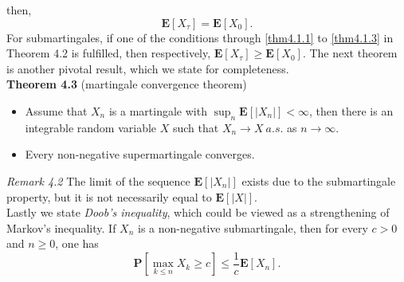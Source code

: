 \documentclass[
11pt, %
a4paper, %
oneside, %
headinclude,footinclude, %
BCOR5mm, %
]{scrartcl}
\begin{document}
then,
\begin{equation}
    \mathbf{E}[X_{\tau}]=\mathbf{E}[X_0]. \tag{4.10}
\end{equation}
For submartingales, if one of the conditions through \ref{thm4.1.1} to \ref{thm4.1.3} in Theorem 4.2 is fulfilled, then respectively, $\mathbf{E}[X_{\tau}] \geq \mathbf{E}[X_0]$. The next theorem is another pivotal result, which we state for completeness.
\vspace{0.6em}\\\textbf{Theorem 4.3} (martingale convergence theorem) 
\begin{itemize}
    \item Assume that $X_n$ is a martingale with $\sup_n \mathbf{E}[|X_n|] < \infty$, then there is an integrable random variable $X$ such that $X_n \rightarrow X \ a.s.$ as $n \rightarrow \infty$. 
    \item Every non-negative supermartingale converges. 
\end{itemize}
\textit{Remark 4.2} The limit of the sequence $\mathbf{E}[|X_n|]$ exists due to the submartingale property, but it is not necessarily equal to $\mathbf{E}[|X|]$.
\vspace{0.6em}\\ Lastly we state \textit{Doob's inequality}, which could be viewed as a strengthening of Markov's inequality. If $X_n$ is a non-negative submartingale, then for every $c > 0$ and $n \geq 0$, one has
\begin{equation}
    \mathbf{P}\left[ \max_{k\leq n} X_k \geq c\right] \leq \frac{1}{c}\mathbf{E}[X_n]. \tag{4.11}
\end{equation}
\end{document}
